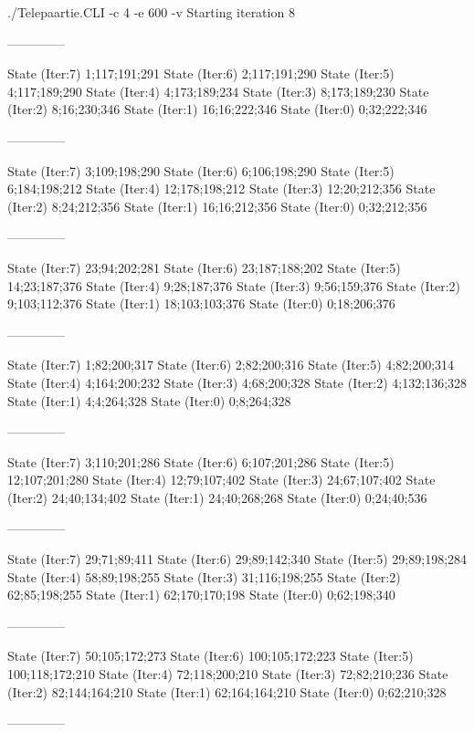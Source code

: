 \documentclass[a4paper,10pt,ngerman]{scrartcl}
\begin{document}
\begin{lstcs}
./Telepaartie.CLI -c 4 -e 600 -v
Starting iteration 8

--------------

State (Iter:7) {1;117;191;291}
State (Iter:6) {2;117;191;290}
State (Iter:5) {4;117;189;290}
State (Iter:4) {4;173;189;234}
State (Iter:3) {8;173;189;230}
State (Iter:2) {8;16;230;346}
State (Iter:1) {16;16;222;346}
State (Iter:0) {0;32;222;346}

--------------

State (Iter:7) {3;109;198;290}
State (Iter:6) {6;106;198;290}
State (Iter:5) {6;184;198;212}
State (Iter:4) {12;178;198;212}
State (Iter:3) {12;20;212;356}
State (Iter:2) {8;24;212;356}
State (Iter:1) {16;16;212;356}
State (Iter:0) {0;32;212;356}

--------------

State (Iter:7) {23;94;202;281}
State (Iter:6) {23;187;188;202}
State (Iter:5) {14;23;187;376}
State (Iter:4) {9;28;187;376}
State (Iter:3) {9;56;159;376}
State (Iter:2) {9;103;112;376}
State (Iter:1) {18;103;103;376}
State (Iter:0) {0;18;206;376}

--------------

State (Iter:7) {1;82;200;317}
State (Iter:6) {2;82;200;316}
State (Iter:5) {4;82;200;314}
State (Iter:4) {4;164;200;232}
State (Iter:3) {4;68;200;328}
State (Iter:2) {4;132;136;328}
State (Iter:1) {4;4;264;328}
State (Iter:0) {0;8;264;328}

--------------

State (Iter:7) {3;110;201;286}
State (Iter:6) {6;107;201;286}
State (Iter:5) {12;107;201;280}
State (Iter:4) {12;79;107;402}
State (Iter:3) {24;67;107;402}
State (Iter:2) {24;40;134;402}
State (Iter:1) {24;40;268;268}
State (Iter:0) {0;24;40;536}

--------------

State (Iter:7) {29;71;89;411}
State (Iter:6) {29;89;142;340}
State (Iter:5) {29;89;198;284}
State (Iter:4) {58;89;198;255}
State (Iter:3) {31;116;198;255}
State (Iter:2) {62;85;198;255}
State (Iter:1) {62;170;170;198}
State (Iter:0) {0;62;198;340}

--------------

State (Iter:7) {50;105;172;273}
State (Iter:6) {100;105;172;223}
State (Iter:5) {100;118;172;210}
State (Iter:4) {72;118;200;210}
State (Iter:3) {72;82;210;236}
State (Iter:2) {82;144;164;210}
State (Iter:1) {62;164;164;210}
State (Iter:0) {0;62;210;328}

--------------


\end{lstcs}
\end{document}
